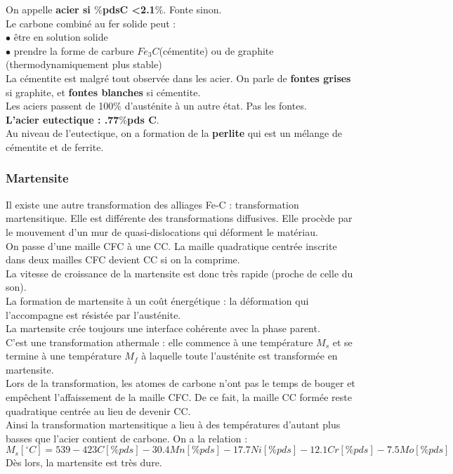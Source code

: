 \documentclass[../main.tex]{subfiles}
\begin{document}
On appelle \textbf{acier si $\%$pdsC <2.1$\%$}. Fonte sinon.\\

Le carbone combiné au fer solide peut :\\
$\bullet$ être en solution solide\\
$\bullet$ prendre la forme de carbure $Fe_3C$(cémentite) ou de graphite (thermodynamiquement plus stable)\\
La cémentite est malgré tout observée dans les acier. On parle de \textbf{fontes grises} si graphite, et \textbf{fontes blanches} si cémentite.\\

Les aciers passent de 100$\%$ d'austénite à un autre état. Pas les fontes.\\
\textbf{L'acier eutectique : .77$\%$pds C}.\\
Au niveau de l'eutectique, on a formation de la \textbf{perlite} qui est un mélange de cémentite et de ferrite.\\

\subsubsection{Martensite}
Il existe une autre transformation des alliages Fe-C : transformation martensitique. Elle est différente des transformations diffusives. Elle procède par le mouvement d'un mur de quasi-dislocations qui déforment le matériau.\\
On passe d'une maille CFC à une CC. La maille quadratique centrée inscrite dans deux mailles CFC devient CC si on la comprime.\\
La vitesse de croissance de la martensite est donc très rapide (proche de celle du son).\\
La formation de martensite à un coût énergétique : la déformation qui l'accompagne est résistée par l'austénite.\\
\warning La martensite crée toujours une interface cohérente avec la phase parent.\\
C'est une transformation athermale : elle commence à une température $M_s$ et se termine à une température $M_f$ à laquelle toute l'austénite est transformée en martensite.\\
Lors de la transformation, les atomes de carbone n'ont pas le temps de bouger et empêchent l'affaissement de la maille CFC. De ce fait, la maille CC formée reste quadratique centrée au lieu de devenir CC.\\
Ainsi la transformation martensitique a lieu à des températures d'autant plus basses que l'acier contient de carbone. On a la relation : \\
\begin{equation}
    M_s[^{\circ}C] = 539-423 C[\% pds] - 30.4 Mn[\% pds] - 17.7 Ni[\% pds] - 12.1 Cr[\% pds] - 7.5 Mo[\% pds]
\end{equation}
Dès lors, la martensite est très dure.\\
\end{document}

